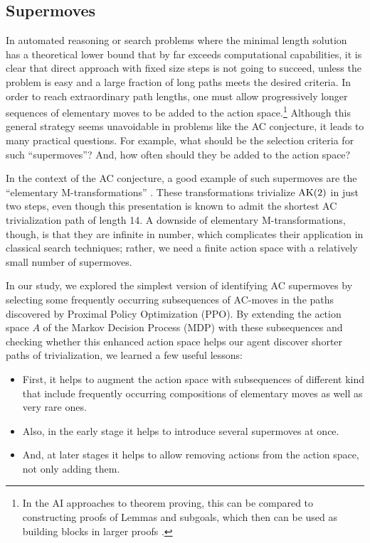 \subsection{Supermoves}

In automated reasoning or search problems where the minimal length solution has a theoretical lower bound that by far exceeds computational capabilities, it is clear that direct approach with fixed size steps is not going to succeed, unless the problem is easy and a large fraction of long paths meets the desired criteria. In order to reach extraordinary path lengths, one must allow progressively longer sequences of elementary moves to be added to the action space.\footnote{In the AI approaches to theorem proving, this can be compared to constructing proofs of Lemmas and subgoals, which then can be used as building blocks in larger proofs \cite{yang2019coqgym,bansal2019holist,polu2020generative,polu2022formal}.} Although this general strategy seems unavoidable in problems like the AC conjecture, it leads to many practical questions. For example, what should be the selection criteria for such ``supermoves''? And, how often should they be added to the action space?

In the context of the AC conjecture, a good example of such supermoves are the ``elementary M-transformations'' \cite{BurnsI, BurnsII}. These transformations trivialize $\text{AK}(2)$ in just two steps, even though this presentation is known to admit the shortest AC trivialization path of length 14. A downside of elementary M-transformations, though, is that they are infinite in number, which complicates their application in classical search techniques; rather, we need a finite action space with a relatively small number of supermoves.

In our study, we explored the simplest version of identifying AC supermoves by selecting some frequently occurring subsequences of AC-moves in the paths discovered by Proximal Policy Optimization (PPO). By extending the action space $A$ of the Markov Decision Process (MDP) with these subsequences and checking whether this enhanced action space helps our agent discover shorter paths of trivialization, we learned a few useful lessons:

\begin{itemize}

	\item First, it helps to augment the action space with subsequences of different kind that include frequently occurring compositions of elementary moves as well as very rare ones.

	\item Also, in the early stage it helps to introduce several supermoves at once.

	\item And, at later stages it helps to allow removing actions from the action space, not only adding them.
\end{itemize}

